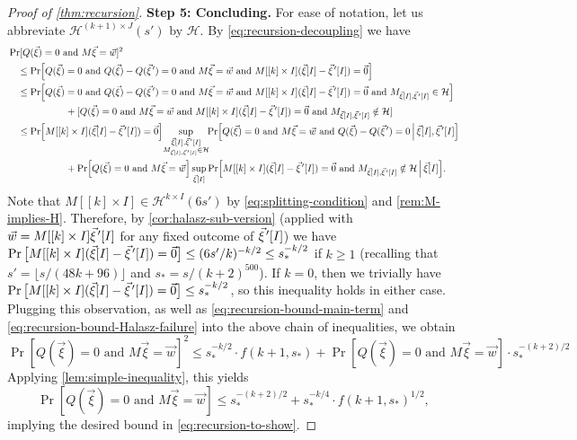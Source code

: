 \documentclass[english]{article}
\theoremstyle{remark}
\numberwithin{equation}{section}
\numberwithin{figure}{section}
\newcommand{\pvec}[1]{\vec{#1}\mkern2mu\vphantom{#1}'}
\let\originalleft\left
\let\originalright\right
\renewcommand{\left}{\mathopen{}\mathclose\bgroup\originalleft}
\renewcommand{\right}{\aftergroup\egroup\originalright}
\begin{document}
\begin{proof}[Proof of \cref{thm:recursion}]
\textbf{Step 5: Concluding.} For ease of notation, let us abbreviate $\mathcal H^{(k+1)\times J}(s')$ by $\mathcal{H}$. By \cref{eq:recursion-decoupling} we have
\begin{align*}
&\Pr[Q(\vec{\xi})=0\text{ and }M\vec{\xi}=\vec{w}]^{2}\\
 &\quad \le \Pr\Bigl[Q(\vec{\xi})=0\text{ and }Q(\vec{\xi})-Q(\pvec{\xi})=0\text{ and }M\vec{\xi}=\vec{w}\text{ and }M[[k]\times I](\vec{\xi}[I]-\pvec{\xi}[I])=\vec 0\Bigr]\\
 &\quad \le\Pr\Bigl[Q(\vec{\xi})=0\text{ and }Q(\vec{\xi})-Q(\pvec{\xi})=0\text{ and }M\vec{\xi}=\vec{w}\text{ and }M[[k]\times I](\vec{\xi}[I]-\pvec{\xi}[I])=\vec 0\text{ and }M_{\vec \xi[I],\pvec{\xi}[I]}\in \mathcal H\Bigr]\\
 &\qquad\qquad\qquad+[Q(\vec{\xi})=0\text{ and }M\vec{\xi}=\vec{w}\text{ and }M[[k]\times I](\vec{\xi}[I]-\pvec{\xi}[I])=\vec 0\text{ and }M_{\vec \xi[I],\pvec{\xi}[I]}\notin \mathcal H]\\
 &\quad \le\Pr\left[M[[k]\times I](\vec{\xi}[I]-\pvec{\xi}[I])=\vec 0\right]\!\sup_{\substack{\vec{\xi}[I],\pvec{\xi}[I]\\M_{\vec \xi[I],\pvec{\xi}[I]}\in \mathcal H}}\!\!\Pr\left[Q(\vec{\xi})=0\text{ and }M\vec{\xi}=\vec{w}\text{ and }Q(\vec{\xi})-Q(\pvec{\xi})=0\,\middle|\,\vec{\xi}[I],\pvec{\xi}[I]\right]\\
 &\qquad\qquad\qquad+\Pr\left[Q(\vec{\xi})=0\text{ and }M\vec{\xi}=\vec{w}\right]\sup_{\vec{\xi}[I]}\Pr\left[M[[k]\times I](\vec{\xi}[I]-\pvec{\xi}[I])=\vec 0\text{ and }M_{\vec \xi[I],\pvec{\xi}[I]}\notin \mathcal H \,\middle|\,\vec{\xi}[I]\right].
\end{align*}
Note that $M[[k]\times I]\in \mathcal H^{k\times I}(6s')$ by \cref{eq:splitting-condition} and \cref{rem:M-implies-H}. Therefore, by \cref{cor:halasz-sub-version} (applied with $\vec w=M[[k]\times I]\pvec{\xi}[I]$ for any fixed outcome of $\pvec{\xi}[I]$) we have $\Pr\big[M[[k]\times I](\vec{\xi}[I]-\pvec{\xi}[I])=\vec 0\big]\le (6s'/k)^{-k/2}\le s_*^{-k/2}$ if $k\ge 1$ (recalling that $s'=\lfloor s/(48k+96)\rfloor$ and $s_*=s/(k+2)^{500}$). If $k=0$, then we trivially have $\Pr\big[M[[k]\times I](\vec{\xi}[I]-\pvec{\xi}[I])=\vec 0\big]\le s_*^{-k/2}$, so this inequality holds in either case. Plugging this observation, as well as \cref{eq:recursion-bound-main-term} and \cref{eq:recursion-bound-Halasz-failure} into the above chain of inequalities, we obtain
\[\Pr[Q(\vec{\xi})=0\text{ and }M\vec{\xi}=\vec{w}]^{2}\le s_*^{-k/2}\cdot f(k+1,s_*)+\Pr[Q(\vec{\xi})=0\text{ and }M\vec{\xi}=\vec{w}]\cdot s_*^{-(k+2)/2}\]
Applying \cref{lem:simple-inequality}, this yields
\[\Pr[Q(\vec{\xi})=0\text{ and }M\vec{\xi}=\vec{w}]\le s_{*}^{-(k+2)/2}+s_{*}^{-k/4}\cdot f(k+1,s_*)^{1/2},\]
implying the desired bound in \cref{eq:recursion-to-show}.
\end{proof}
\end{document}
